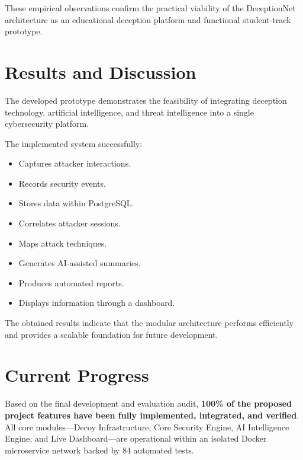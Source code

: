 \documentclass[12pt,a4paper]{report}
\begin{document}
These empirical observations confirm the practical viability of the DeceptionNet architecture as an educational deception platform and functional student-track prototype.

\section{Results and Discussion}

The developed prototype demonstrates the feasibility of integrating deception technology, artificial intelligence, and threat intelligence into a single cybersecurity platform.

The implemented system successfully:

\begin{itemize}
\item Captures attacker interactions.
\item Records security events.
\item Stores data within PostgreSQL.
\item Correlates attacker sessions.
\item Maps attack techniques.
\item Generates AI-assisted summaries.
\item Produces automated reports.
\item Displays information through a dashboard.
\end{itemize}

The obtained results indicate that the modular architecture performs efficiently and provides a scalable foundation for future development.


\section{Current Progress}

Based on the final development and evaluation audit, \textbf{100\% of the proposed project features have been fully implemented, integrated, and verified}. All core modules—Decoy Infrastructure, Core Security Engine, AI Intelligence Engine, and Live Dashboard—are operational within an isolated Docker microservice network backed by 84 automated tests.

\clearpage

\end{document}
